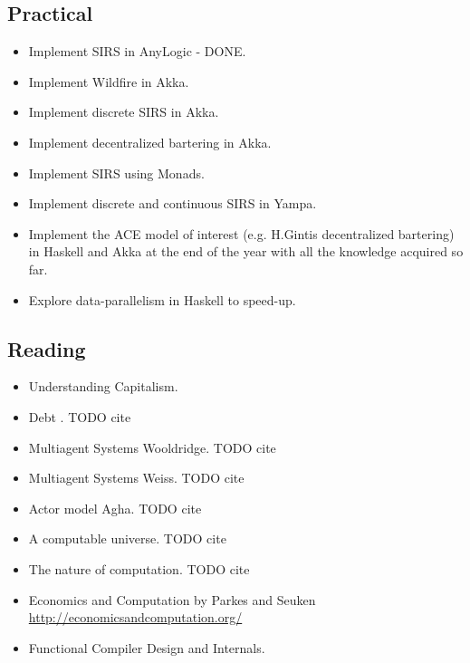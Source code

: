 \documentclass{article}
\begin{document}
\subsection{Practical}
\begin{itemize}
\item Implement SIRS in AnyLogic - DONE.
\item Implement Wildfire in Akka.
\item Implement discrete SIRS in Akka.
\item Implement decentralized bartering in Akka.
\item Implement SIRS using Monads.
\item Implement discrete and continuous SIRS in Yampa.
\item Implement the ACE model of interest (e.g. H.Gintis decentralized bartering) in Haskell and Akka at the end of the year with all the knowledge acquired so far.
\item Explore data-parallelism in Haskell to speed-up.
\end{itemize}

\subsection{Reading}
\begin{itemize}
\item Understanding Capitalism. \cite{bowles_understanding_2005}
\item Debt . TODO cite
\item Multiagent Systems Wooldridge. TODO cite
\item Multiagent Systems Weiss. TODO cite
\item Actor model Agha. TODO cite
\item A computable universe. TODO cite
\item The nature of computation. TODO cite
\item Economics and Computation by Parkes and Seuken \url{http://economicsandcomputation.org/}
\item Functional Compiler Design and Internals.
\end{itemize}
\end{document}
